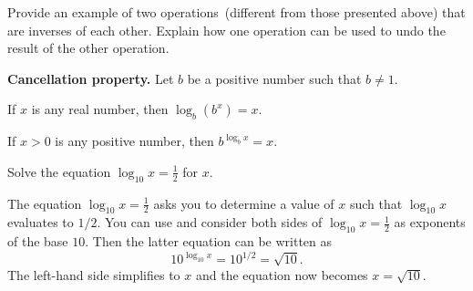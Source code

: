 \documentclass[a4paper,oneside,12pt]{article}
\begin{document}
\begin{exercise}
Provide an example of two operations~(different from those presented
above) that are inverses of each other.  Explain how one operation can
be used to undo the result of the other operation.
\end{exercise}


\begin{theorem}
\label{thm:logarithm:cancellation_property}
\textbf{Cancellation property.}
Let $b$ be a positive number such that $b \neq 1$.
\begin{packedenum}
\item\label{subthm:logarithm:cancellation_property_log_exponential}
  If $x$ is any real number, then $\log_b (b^x) = x$.

\item\label{subthm:logarithm:cancellation_property_exponential_log}
  If $x > 0$ is any positive number, then $b^{\log_b x} = x$.
\end{packedenum}
\end{theorem}

\begin{example}
Solve the equation $\log_{10} x = \frac{1}{2}$ for $x$.
\end{example}

\begin{solution}
The equation $\log_{10} x = \frac{1}{2}$ asks you to determine a value
of $x$ such that $\log_{10} x$ evaluates to $1 / 2$.  You can use
and consider both sides of $\log_{10} x = \frac{1}{2}$ as exponents of
the base $10$.  Then the latter equation can be written as
\[
10^{\log_{10} x}
=
10^{1/2}
=
\sqrt{10}.
\]
The left-hand side simplifies to $x$ and the equation now becomes
$x = \sqrt{10}$.
\end{solution}
\end{document}
